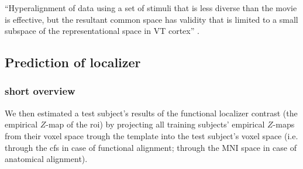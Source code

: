 %
``Hyperalignment of data using a set of stimuli that is less diverse than the
movie is effective, but the resultant common space has validity that is limited
to a small subspace of the representational space in VT cortex''
\citep{haxby2011common}.



\subsection{Prediction of localizer}


\subsubsection{short overview}




%
We then estimated a test subject's results of the functional localizer contrast
(the empirical $Z$-map of the \ac{roi}) by projecting all training subjects'
empirical $Z$-maps from their voxel space trough the template into the test
subject's voxel space (i.e. through the \ac{cfs} in case of functional
alignment; through the MNI space in case of anatomical alignment).


